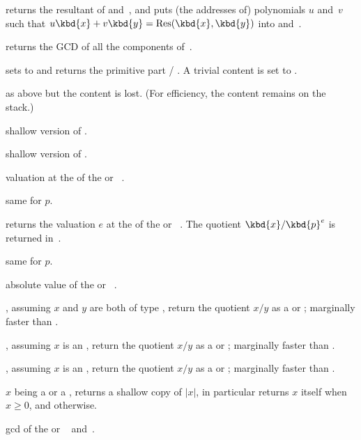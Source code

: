  returns the resultant
of  and~, and puts (the addresses of) polynomials $u$ and~$v$
such that $u\kbd{x}+v\kbd{y}=\text{Res}(\kbd{x},\kbd{y})$ into 
and~.

 returns the GCD of all the components of~.

 sets  to 
and returns the primitive part  / . A trivial content is set to
.

 as above but the content is lost.
(For efficiency, the content remains on the stack.)

 shallow version of .

 shallow version of .


 valuation at the  
of the  or ~.

 same for  $p$.

 returns the valuation $e$ at the
  of the  or ~. The quotient
$\kbd{x}/\kbd{p}^{e}$ is returned in~.

 same for  $p$.

 absolute value of the  or
~.

, assuming $x$ and $y$
are both of type , return the quotient $x/y$ as a  or
; marginally faster than .

, assuming $x$
is an , return the quotient $x/y$ as a  or
; marginally faster than .

, assuming $x$
is an , return the quotient $x/y$ as a  or
; marginally faster than .

 $x$ being a  or a , returns
a shallow copy of $|x|$, in particular returns $x$ itself when $x \geq 0$, and
 otherwise.

 gcd of the  or ~
and~.
\smallskip

